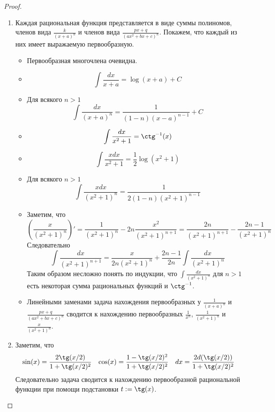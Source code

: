 \documentclass[12pt,a4paper]{article}
\begin{document}
    \begin{proof}
        \begin{enumerate}
            \item Каждая рациональная функция представляется в виде суммы полиномов, членов вида $\frac{k}{(x+a)^n}$ и членов вида $\frac{px+q}{(ax^2+bx+c)^n}$. Покажем, что каждый из них имеет выражаемую первообразную.
                \begin{itemize}
                    \item Первообразная многочлена очевидна.
                    \item \[\int \frac{dx}{x+a} = \log(x+a) + C\]
                    \item Для всякого $n > 1$
                        \[\int \frac{dx}{(x+a)^n} = \frac{1}{(1-n)(x-a)^{n-1}} + C\]
                    \item \[\int \frac{dx}{x^2+1} = \ctg^{-1}(x)\]
                    \item \[\int \frac{xdx}{x^2+1} = \frac{1}{2} \log(x^2+1)\]
                    \item Для всякого $n > 1$
                        \[\int \frac{xdx}{(x^2 + 1)^n} = \frac{1}{2(1-n)(x^2+1)^{n-1}}\]
                    \item Заметим, что
                        \[
                            \left(\frac{x}{(x^2+1)^n}\right)'
                            = \frac{1}{(x^2+1)^n} - 2n \frac{x^2}{(x^2+1)^{n+1}}
                            = \frac{2n}{(x^2+1)^{n+1}} - \frac{2n-1}{(x^2+1)^n}
                        \]
                        Следовательно
                        \[\int \frac{dx}{(x^2+1)^{n+1}} = \frac{x}{2n(x^2+1)^n} + \frac{2n-1}{2n} \int \frac{dx}{(x^2+1)^n}\]
                        Таким образом несложно понять по индукции, что $\int \frac{dx}{(x^2+1)^n}$ для $n > 1$ есть некоторая сумма рациональных функций и $\ctg^{-1}$.
                    \item Линейными заменами задача нахождения первообразных у $\frac{1}{(x+a)^n}$ и $\frac{px+q}{(ax^2+bx+c)^n}$ сводится к нахождению первообразных $\frac{1}{x^n}$, $\frac{1}{(x^2+1)^n}$ и $\frac{x}{(x^2+1)^n}$.
                \end{itemize}

            \item Заметим, что
                \begin{align*}
                    \sin(x) &= \frac{2 \tg(x/2)}{1 + \tg(x/2)^2}&
                    \cos(x) &= \frac{1 - \tg(x/2)^2}{1 + \tg(x/2)^2}&
                    dx &= \frac{2d(\tg(x/2))}{1+\tg(x/2)^2}
                \end{align*}
                Следовательно задача сводится к нахождению первообразной рациональной функции при помощи подстановки $t := \tg(x)$.


\end{enumerate}
\end{proof}
\end{document}

